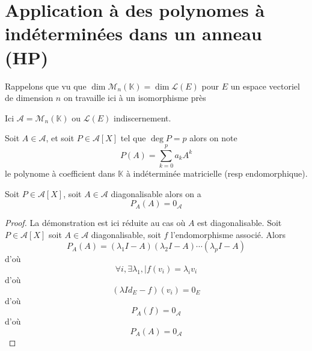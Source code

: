 \documentclass[11pt,colorlinks]{book}
\theoremstyle{mytheoremstyle}
\theoremstyle{mytheoremstyle}
\theoremstyle{mytheoremstyle}
\theoremstyle{mytheoremstyle}
\theoremstyle{mytheoremstyle}
\theoremstyle{mytheoremstyle}
\theoremstyle{mytheoremstyle}
\theoremstyle{mytheoremstyle}
\theoremstyle{myproblemstyle}
\def\mbb#1{\mathbb{#1}}
\def\mfc#1{\mathcal{#1}}
\def\bK{\mbb{K}}
\begin{document}
\section{Application à des polynomes à indéterminées dans un anneau  (HP)}
\begin{rmq}
  Rappelons que vu que $\dim \mfc{M}_n(\bK) = \dim \mfc{L}(E)$ pour $E$ un espace vectoriel de dimension $n$ on travaille ici à un isomorphisme près
\end{rmq}
\begin{rmq}
  Ici $\mfc{A} = \mfc{M}_n(\bK)$ ou $\mfc{L}(E)$ indiscernement.
\end{rmq}
\begin{definition}
  Soit $A \in \mfc{A}$, et soit $P \in \mfc{A}[X]$ tel que $\deg P = p$ alors on note 
  \begin{equation*}
    P(A) = \sum_{k=0}^p a_k A^k
  \end{equation*}
  le polynome à coefficient dans $\bK$ à indéterminée matricielle (resp endomorphique).
\end{definition}
\begin{theorem}
  Soit $P \in \mfc{A}[X]$, soit $A \in \mfc{A}$ diagonalisable alors on a 
  \begin{equation*}
    P_A(A) = 0_{\mfc{A}}
  \end{equation*}
  \begin{proof}
    La démonstration est ici réduite au cas où $A$ est diagonalisable.
    Soit $P \in \mfc{A}[X]$ soit $A \in \mfc{A}$ diagonalisable, soit $f$ l'endomorphisme associé. Alors
    \begin{equation*}
      P_A(A) = (\lambda_1I - A)(\lambda_2I-A)\cdots(\lambda_pI-A)
    \end{equation*}
    d'où
    \begin{equation*}
      \forall i, \exists \lambda_1, | f(v_i) = \lambda_i v_i
    \end{equation*}
    d'où
    \begin{equation*}
      (\lambda Id_E-f)(v_i) = 0_E
    \end{equation*}
    d'où
    \begin{equation*}
      P_A(f) = 0_{\mfc{A}}
    \end{equation*}
    d'où
    \begin{equation*}
      P_A(A) = 0_{\mfc{A}}
    \end{equation*}
  \end{proof}
\end{theorem}
\end{document}

